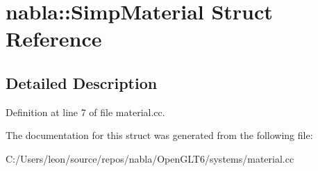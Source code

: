\hypertarget{structnabla_1_1_simp_material}{}\section{nabla\+::Simp\+Material Struct Reference}
\label{structnabla_1_1_simp_material}


\subsection{Detailed Description}


Definition at line 7 of file material.\+cc.



The documentation for this struct was generated from the following file\+:\begin{DoxyCompactItemize}
\item 
C\+:/\+Users/leon/source/repos/nabla/\+Open\+G\+L\+T6/systems/material.\+cc\end{DoxyCompactItemize}
